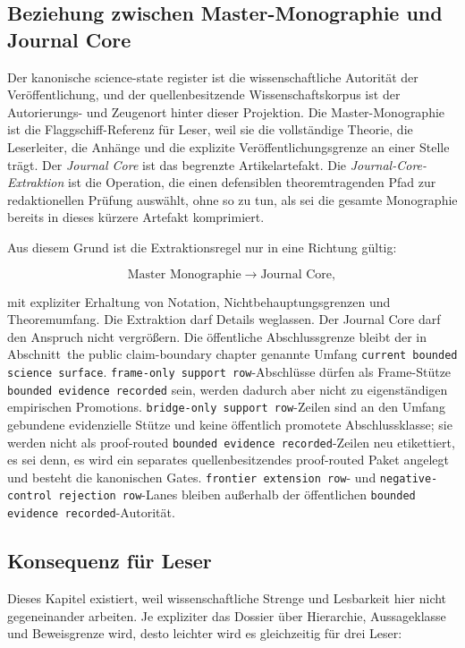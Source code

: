 \subsection{Beziehung zwischen Master-Monographie und Journal Core}

Der kanonische science-state register ist die wissenschaftliche Autorität der Veröffentlichung,
und der quellenbesitzende Wissenschaftskorpus ist der Autorierungs- und
Zeugenort hinter dieser Projektion. Die Master-Monographie ist die
Flaggschiff-Referenz für Leser, weil sie die vollständige Theorie, die
Leserleiter, die Anhänge und die explizite Veröffentlichungsgrenze an einer
Stelle trägt.
Der \emph{Journal Core} ist das begrenzte Artikelartefakt. Die
\emph{Journal-Core-Extraktion} ist die Operation, die einen defensiblen
theoremtragenden Pfad zur redaktionellen Prüfung auswählt, ohne so zu tun, als
sei die gesamte Monographie bereits in dieses kürzere Artefakt komprimiert.

Aus diesem Grund ist die Extraktionsregel nur in eine Richtung gültig:

\[
\text{Master Monographie} \longrightarrow \text{Journal Core},
\]

mit expliziter Erhaltung von Notation, Nichtbehauptungsgrenzen und Theoremumfang.
Die Extraktion darf Details weglassen. Der Journal Core darf den Anspruch nicht
vergrößern.
Die öffentliche Abschlussgrenze bleibt der in
Abschnitt~the public claim-boundary chapter genannte Umfang
\texttt{current bounded science surface}. \texttt{frame-only support row}-Abschlüsse dürfen als
Frame-Stütze \texttt{bounded evidence recorded} sein, werden dadurch aber nicht zu eigenständigen
empirischen Promotions. \texttt{bridge-only support row}-Zeilen sind an den Umfang
gebundene evidenzielle Stütze und keine öffentlich promotete Abschlussklasse;
sie werden nicht als proof-routed \texttt{bounded evidence recorded}-Zeilen neu etikettiert, es
sei denn, es wird ein separates quellenbesitzendes proof-routed Paket
angelegt und besteht die kanonischen Gates. \texttt{frontier extension row}- und
\texttt{negative-control rejection row}-Lanes bleiben außerhalb der öffentlichen \texttt{bounded evidence recorded}-Autorität.

\subsection{Konsequenz für Leser}

Dieses Kapitel existiert, weil wissenschaftliche Strenge und Lesbarkeit hier
nicht gegeneinander arbeiten.
Je expliziter das Dossier über Hierarchie, Aussageklasse und Beweisgrenze wird,
desto leichter wird es gleichzeitig für drei Leser:

